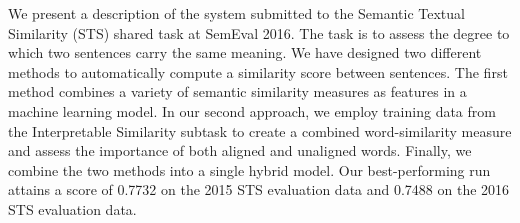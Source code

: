 We present a description of the system submitted to the Semantic Textual Similarity (STS) shared task at SemEval 2016. The task is to assess the degree to which two sentences carry the same meaning. We have designed two different methods to automatically compute a similarity score between sentences. The first method combines a variety of semantic similarity measures as features in a machine learning model. In our second approach, we employ training data from the Interpretable Similarity subtask to create a combined word-similarity measure and assess the importance of both aligned and unaligned words. Finally, we combine the two methods into a single hybrid model. Our best-performing run attains a score of 0.7732 on the 2015 STS evaluation data and 0.7488 on the 2016 STS evaluation data.
